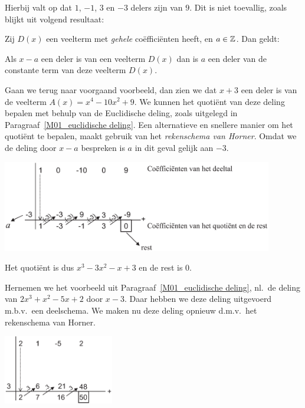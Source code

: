 \documentclass{ximera}
\begin{document}
Hierbij valt op dat $1$, $-1$, $3$ en $-3$ delers zijn van $9$.
Dit is niet toevallig, zoals blijkt uit volgend resultaat:

\begin{proposition}
Zij $D(x)$ een veelterm met \textit{gehele} coëfficiënten heeft, en $a\in\mathbb{Z}$. Dan geldt:

Als $x-a$ een deler is van een veelterm $D(x)$ dan is $a$ een
deler van de constante term van deze veelterm $D(x)$.
\end{proposition}

Gaan we terug naar voorgaand voorbeeld, dan zien we dat $x+3$ een deler is van de veelterm $A(x)=x^4-10x^2+9$. 
We kunnen het quoti\"{e}nt van deze deling bepalen met behulp van de Euclidische deling, zoals uitgelegd in Paragraaf~\ref{M01_euclidische deling}. 
Een alternatieve en snellere manier om het quoti\"{e}nt te bepalen, maakt gebruik van het \emph{rekenschema van Horner}. 
Omdat we de deling door $x-a$ bespreken is $a$ in dit geval gelijk aan $-3$.

\begin{center} \includegraphics[height=4cm]{Horner}
\end{center}

\noindent Het quoti\"{e}nt is dus $x^3-3x^2-x+3$ en de rest is
$0$.

Hernemen we het voorbeeld uit Paragraaf~\ref{M01_euclidische deling},
nl.~de deling van $2x^3+x^2-5x+2$ door $x-3$. Daar hebben we deze
deling uitgevoerd m.b.v.~een deelschema. We maken nu deze deling
opnieuw d.m.v.~het rekenschema van Horner.

\begin{center}\includegraphics[height=3cm]{Horner2}
\end{center}
\end{document}
